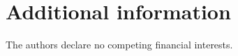 \section*{Additional information}

The authors declare no competing financial interests.

\processdelayedfloats

\renewcommand{\thefigure}{S\arabic{figure}}
\renewcommand{\thepostfigure}{S\arabic{postfigure}}
\setcounter{figure}{0}
\setcounter{postfigure}{0}
    